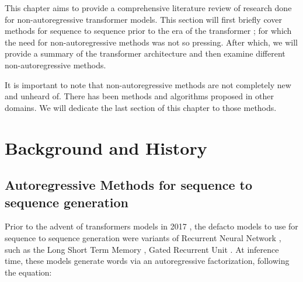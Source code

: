 












This chapter aims to provide a comprehensive literature review of research done for non-autoregressive transformer models. This section will first briefly cover methods for sequence to sequence prior to the era of the transformer \cite{vaswani_attention_2017}; for which the need for non-autoregressive methods was not so pressing. After which, we will provide a summary of the transformer architecture \cite{vaswani_attention_2017} and then examine different non-autoregressive methods.

It is important to note that non-autoregressive methods are not completely new and unheard of. There has been methods and algorithms proposed in other domains. We will dedicate the last section of this chapter to those methods. 



\section{Background and History} \label{sec:background}
\subsection{Autoregressive Methods for sequence to sequence generation} \label{subsec:background1}
Prior to the advent of transformers models in 2017 \cite{vaswani_attention_2017}, the defacto models to use for sequence to sequence generation were variants of Recurrent Neural Network \cite{elman_distributed_1991}, such as the Long Short Term Memory \cite{lstm_original}, Gated Recurrent Unit \cite{gru_paper}. At inference time, these models generate words via an autoregressive factorization, following the equation:

